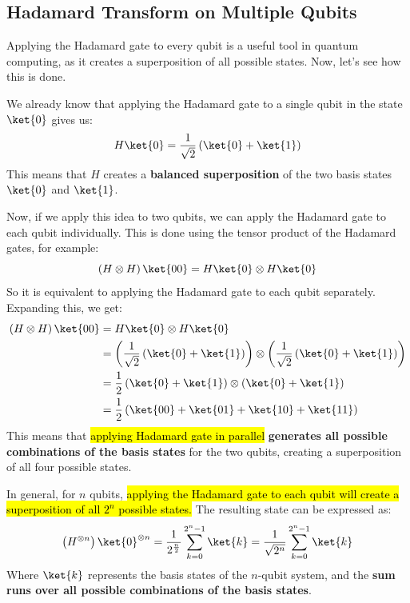\subsection{Hadamard Transform on Multiple Qubits}

Applying the Hadamard gate to every qubit is a useful tool in quantum computing, as it creates a superposition of all possible states. Now, let's see how this is done.

\highspace
We already know that applying the Hadamard gate to a single qubit in the state $\ket{0}$ gives us:
\begin{equation*}
    H\ket{0} = \frac{1}{\sqrt{2}}\left(\ket{0} + \ket{1}\right)
\end{equation*}
This means that $H$ creates a \textbf{balanced superposition} of the two basis states $\ket{0}$ and $\ket{1}$.

\highspace
Now, if we apply this idea to two qubits, we can apply the Hadamard gate to each qubit individually. This is done using the tensor product of the Hadamard gates, for example:
\begin{equation*}
    \left(H \otimes H\right) \ket{00} = H\ket{0} \otimes H\ket{0}
\end{equation*}
So it is equivalent to applying the Hadamard gate to each qubit separately. Expanding this, we get:
\begin{align*}
    \left(H \otimes H\right) \ket{00} &= H\ket{0} \otimes H\ket{0} \\
    &= \left(\frac{1}{\sqrt{2}}\left(\ket{0} + \ket{1}\right)\right) \otimes \left(\frac{1}{\sqrt{2}}\left(\ket{0} + \ket{1}\right)\right) \\
    &= \frac{1}{2} \left(\ket{0} + \ket{1}\right) \otimes \left(\ket{0} + \ket{1}\right) \\
    &= \frac{1}{2} \left(\ket{00} + \ket{01} + \ket{10} + \ket{11}\right)
\end{align*}
This means that \hl{applying Hadamard gate in parallel} \textbf{generates all possible combinations of the basis states} for the two qubits, creating a superposition of all four possible states.

\highspace
In general, for $n$ qubits, \hl{applying the Hadamard gate to each qubit will create a superposition of all $2^n$ possible states.} The resulting state can be expressed as:
\begin{equation}\label{eq:hadamard-transform-multiple-qubits}
    \left(H^{\otimes n}\right) \ket{0}^{\otimes n} = \frac{1}{2^{\frac{n}{2}}} \sum_{k = 0}^{2^n - 1} \ket{k} = \frac{1}{\sqrt{2^n}} \sum_{k = 0}^{2^n - 1} \ket{k}
\end{equation}
Where $\ket{k}$ represents the basis states of the $n$-qubit system, and the \textbf{sum runs over all possible combinations of the basis states}.

